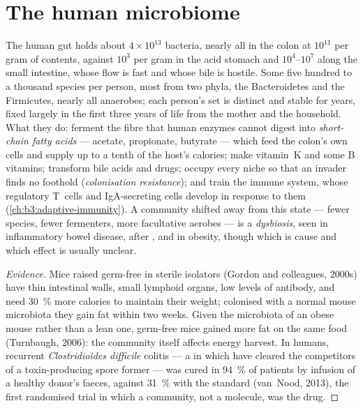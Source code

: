 \section{The human microbiome}

\begin{definition}\label{def:b3:microbiomes:gut}
The human gut holds about $4\times 10^{13}$ bacteria, nearly all in the
colon at $10^{11}$ per gram of contents, against $10^{3}$ per gram in
the acid stomach and $10^{4}$--$10^{7}$ along the small intestine, whose
flow is fast and whose bile is hostile. Some five hundred to a thousand
species per person, most from two phyla, the Bacteroidetes and the
Firmicutes, nearly all anaerobes; each person's set is distinct and
stable for years, fixed largely in the first three years of life from
the mother and the household. What they do: ferment the fibre that
human enzymes cannot digest into \emph{short-chain fatty acids} ---
acetate, propionate, butyrate --- which feed the colon's own cells and
supply up to a tenth of the host's calories; make vitamin~K and some B
vitamins; transform bile acids and drugs; occupy every niche so that an
invader finds no foothold (\emph{colonisation resistance}); and train
the immune system, whose regulatory T~cells and IgA-secreting cells
develop in response to them (\cref{ch:b3:adaptive-immunity}). A
community shifted away from this state --- fewer species, fewer
fermenters, more facultative aerobes --- is a \emph{dysbiosis}, seen in
inflammatory bowel disease, after , and in obesity, though
which is cause and which effect is usually unclear.
\end{definition}

\begin{proof}[Evidence]
Mice raised germ-free in sterile isolators (Gordon and colleagues,
2000s) have thin intestinal walls, small lymphoid organs, low levels of
antibody, and need \qty{30}{\%} more calories to maintain their weight;
colonised with a normal mouse microbiota they gain fat within two
weeks. Given the microbiota of an obese mouse rather than a lean one,
germ-free mice gained more fat on the same food (Turnbaugh, 2006): the
community itself affects energy harvest. In humans, recurrent
\emph{Clostridioides difficile} colitis --- a  in which
 have cleared the competitors of a toxin-producing spore
former --- was cured in \qty{94}{\%} of patients by infusion of a
healthy donor's faeces, against \qty{31}{\%} with the standard
 (van~Nood, 2013), the first randomised trial in which a
community, not a molecule, was the drug.
\end{proof}

